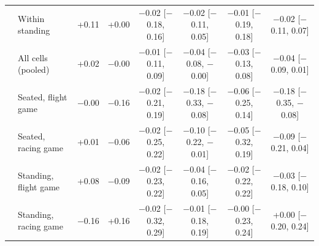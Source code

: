 \begin{table}[ht]
\begin{tabular}{@{}llcccccc@{}}
 & Within standing & +0.11 & +0.00 & $-$0.02 [$-$0.18, 0.16] & $-$0.02 [$-$0.11, 0.05] & $-$0.01 [$-$0.19, 0.18] & $-$0.02 [$-$0.11, 0.07] \\
 & All cells (pooled) & +0.02 & $-$0.00 & $-$0.01 [$-$0.11, 0.09] & $-$0.04 [$-$0.08, $-$0.00] & $-$0.03 [$-$0.13, 0.08] & $-$0.04 [$-$0.09, 0.01] \\
 & Seated, flight game & $-$0.00 & $-$0.16 & $-$0.02 [$-$0.21, 0.19] & $-$0.18 [$-$0.33, $-$0.08] & $-$0.06 [$-$0.25, 0.14] & $-$0.18 [$-$0.35, $-$0.08] \\
 & Seated, racing game & +0.01 & $-$0.06 & $-$0.02 [$-$0.25, 0.22] & $-$0.10 [$-$0.22, $-$0.01] & $-$0.05 [$-$0.32, 0.19] & $-$0.09 [$-$0.21, 0.04] \\
 & Standing, flight game & +0.08 & $-$0.09 & $-$0.02 [$-$0.23, 0.22] & $-$0.04 [$-$0.16, 0.05] & $-$0.02 [$-$0.22, 0.22] & $-$0.03 [$-$0.18, 0.10] \\
 & Standing, racing game & $-$0.16 & +0.16 & $-$0.02 [$-$0.32, 0.29] & $-$0.01 [$-$0.18, 0.19] & $-$0.00 [$-$0.23, 0.24] & +0.00 [$-$0.20, 0.24] \\
\bottomrule
\end{tabular}
\end{table}